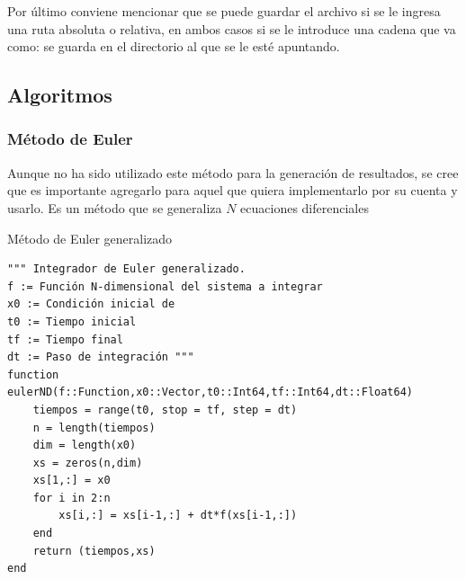 \setlength{\parindent}{0cm} Por último conviene mencionar que se puede guardar el archivo si se le ingresa una ruta absoluta o relativa, en ambos casos si se le introduce una cadena que va como:  se guarda en el directorio al que se le esté apuntando. 

\newpage
\subsection{Algoritmos}\label{sec:algoritmos}



\subsubsection{Método de Euler}

Aunque no ha sido utilizado este método para la generación de resultados, se cree que es importante agregarlo para aquel que quiera implementarlo por su cuenta y usarlo. Es un método que se generaliza $N$ ecuaciones diferenciales
\begin{algorithm}
	\caption{Método de Euler generalizado}
	\label{al:Euler}
	\begin{verbatim}
""" Integrador de Euler generalizado.
f := Función N-dimensional del sistema a integrar
x0 := Condición inicial de
t0 := Tiempo inicial
tf := Tiempo final
dt := Paso de integración """
function eulerND(f::Function,x0::Vector,t0::Int64,tf::Int64,dt::Float64)          
	tiempos = range(t0, stop = tf, step = dt)
	n = length(tiempos)                      
	dim = length(x0)                         
	xs = zeros(n,dim)                        
	xs[1,:] = x0                             
	for i in 2:n 
		xs[i,:] = xs[i-1,:] + dt*f(xs[i-1,:])
	end
	return (tiempos,xs)
end
	\end{verbatim}
\end{algorithm}

